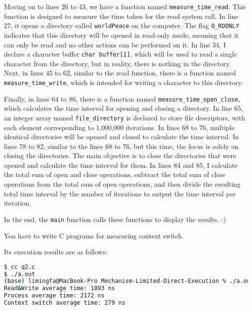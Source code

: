 \documentclass[10pt, answers]{exam}
\begin{document}
\begin{questions}
\begin{solution}
Moving on to lines 26 to 43, we have a function named \texttt{measure\_time\_read}. This function is designed to measure the time taken for the read system call. In line 27, it opens a directory called \texttt{worldPeace} on the computer. The flag \texttt{O\_RDONLY} indicates that this directory will be opened in read-only mode, meaning that it can only be read and no other actions can be performed on it. In line 34, I declare a character buffer \texttt{char buffer[1]}, which will be used to read a single character from the directory, but in reality, there is nothing in the directory. Next, in lines 45 to 62, similar to the read function, there is a function named \texttt{measure\_time\_write}, which is intended for writing a character to this directory.

Finally, in lines 64 to 86, there is a function named \texttt{measure\_time\_open\_close}, which calculates the time interval for opening and closing a directory. In line 65, an integer array named \texttt{file\_directory} is declared to store file descriptors, with each element corresponding to 1,000,000 iterations. In lines 68 to 76, multiple identical directories will be opened and closed to calculate the time interval. In lines 78 to 82, similar to the lines 68 to 76, but this time, the focus is solely on closing the directories. The main objective is to close the directories that were opened and calculate the time interval for them. In lines 84 and 85, I calculate the total sum of open and close operations, subtract the total sum of close operations from the total sum of open operations, and then divide the resulting total time interval by the number of iterations to output the time interval per iteration.

In the end, the \texttt{main} function calls these functions to display the results. :)



\end{solution}

\question 
You have to write C programs for measuring context switch.

\begin{solution}



Its execution results are as follows:

\begin{lstlisting}[language=bash]
$ cc q2.c
$ ./a.out
(base) limingfa@MacBook-Pro Mechanism-Limited-Direct-Execution % ./a.out
Read&Write average time: 1893 ns
Process average time: 2172 ns
Context switch average time: 279 ns
\end{lstlisting}


\end{solution}
\end{questions}
\end{document}
